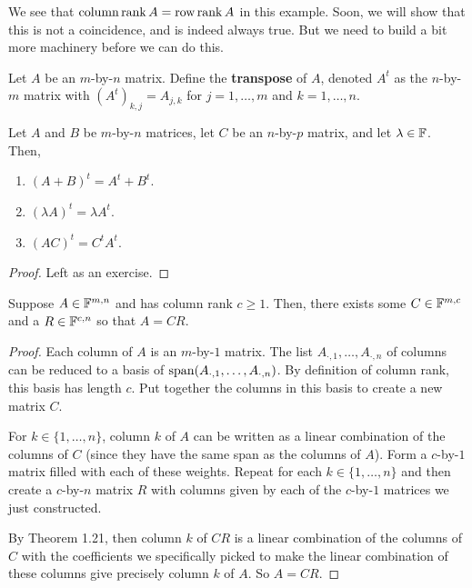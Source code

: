 We see that $\operatorname{column} \operatorname{rank} A = \operatorname{row} \operatorname{rank} A$ in this example. Soon, we will show that this is not a coincidence, and is indeed always true. But we need to build a bit more machinery before we can do this.
\newpage
\begin{definition}[Transpose]
    Let $A$ be an $m$-by-$n$ matrix. Define the \textbf{transpose} of $A$, denoted $A^t$ as the $n$-by-$m$ matrix with $(A^t)_{k,j} = A_{j,k}$ for $j = 1, \dots, m$ and $k = 1, \dots, n$.
\end{definition}
\begin{theorem}
    Let $A$ and $B$ be $m$-by-$n$ matrices, let $C$ be an $n$-by-$p$ matrix, and let $\lambda\in\mathbb F$. Then,
    \begin{enumerate}
        \item $(A+B)^t = A^t + B^t$.
        \item $(\lambda A)^t = \lambda A^t$.
        \item $(AC)^t = C^tA^t$.
    \end{enumerate}
\end{theorem}
\begin{proof}
    Left as an exercise.
\end{proof}
\begin{theorem}
    Suppose $A \in \mathbb F^{m,n}$ and has column rank $c \ge 1$. Then, there exists some $C\in\mathbb F^{m,c}$ and a $R\in\mathbb F^{c,n}$ so that $A = CR$.
\end{theorem}
\begin{proof}
    Each column of $A$ is an $m$-by-$1$ matrix. The list $A_{\cdot, 1}, \dots, A_{\cdot, n}$ of columns can be reduced to a basis of $\operatorname{span}(A_{\cdot, 1}, \dots, A_{\cdot, n})$. By definition of column rank, this basis has length $c$. Put together the columns in this basis to create a new matrix $C$.

    For $k\in\{1, \dots, n\}$, column $k$ of $A$ can be written as a linear combination of the columns of $C$ (since they have the same span as the columns of $A$). Form a $c$-by-$1$ matrix filled with each of these weights. Repeat for each $k\in\{1, \dots, n\}$ and then create a $c$-by-$n$ matrix $R$ with columns given by each of the $c$-by-$1$ matrices we just constructed. 

    By Theorem 1.21, then column $k$ of $CR$ is a linear combination of the columns of $C$ with the coefficients we specifically picked to make the linear combination of these columns give precisely column $k$ of $A$. So $A=CR$.
\end{proof}
